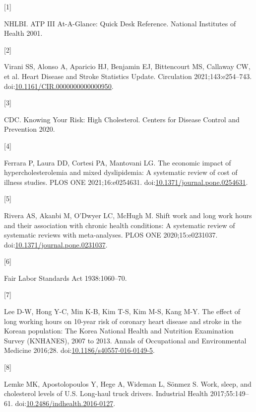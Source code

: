 \documentclass[]{elsarticle} %
\newlength{\cslhangindent}
\newlength{\csllabelwidth}
\newenvironment{CSLReferences}[2] %
 {%
  \setlength{\parindent}{0pt}
  \ifodd #1 \everypar{\setlength{\hangindent}{\cslhangindent}}\ignorespaces\fi
  \ifnum #2 > 0
  \setlength{\parskip}{#2\baselineskip}
  \fi
 }%
 {}
\newcommand{\CSLLeftMargin}[1]{\parbox[t]{\csllabelwidth}{#1}}
\newcommand{\CSLRightInline}[1]{\parbox[t]{\linewidth - \csllabelwidth}{#1}\break}
\begin{document}
\hypertarget{refs}{}
\begin{CSLReferences}{0}{0}
\leavevmode{}%
\CSLLeftMargin{{[}1{]} }
\CSLRightInline{NHLBI. {ATP III At}-{A}-{Glance}: Quick {Desk
Reference}. National Institutes of Health 2001.}

\leavevmode{}%
\CSLLeftMargin{{[}2{]} }
\CSLRightInline{Virani SS, Alonso A, Aparicio HJ, Benjamin EJ,
Bittencourt MS, Callaway CW, et al. Heart {Disease} and {Stroke
Statistics}\textemdash 2021 {Update}. Circulation 2021;143:e254--743.
doi:\href{https://doi.org/10.1161/CIR.0000000000000950}{10.1161/CIR.0000000000000950}.}

\leavevmode{}%
\CSLLeftMargin{{[}3{]} }
\CSLRightInline{CDC. Knowing {Your Risk}: High {Cholesterol}. Centers
for Disease Control and Prevention 2020.}

\leavevmode{}%
\CSLLeftMargin{{[}4{]} }
\CSLRightInline{Ferrara P, Laura DD, Cortesi PA, Mantovani LG. The
economic impact of hypercholesterolemia and mixed dyslipidemia: A
systematic review of cost of illness studies. PLOS ONE 2021;16:e0254631.
doi:\href{https://doi.org/10.1371/journal.pone.0254631}{10.1371/journal.pone.0254631}.}

\leavevmode{}%
\CSLLeftMargin{{[}5{]} }
\CSLRightInline{Rivera AS, Akanbi M, O'Dwyer LC, McHugh M. Shift work
and long work hours and their association with chronic health
conditions: A systematic review of systematic reviews with
meta-analyses. PLOS ONE 2020;15:e0231037.
doi:\href{https://doi.org/10.1371/journal.pone.0231037}{10.1371/journal.pone.0231037}.}

\leavevmode{}%
\CSLLeftMargin{{[}6{]} }
\CSLRightInline{Fair {Labor Standards Act} 1938:1060--70.}

\leavevmode{}%
\CSLLeftMargin{{[}7{]} }
\CSLRightInline{Lee D-W, Hong Y-C, Min K-B, Kim T-S, Kim M-S, Kang M-Y.
The effect of long working hours on 10-year risk of coronary heart
disease and stroke in the {Korean} population: The {Korea National
Health} and {Nutrition Examination Survey} ({KNHANES}), 2007 to 2013.
Annals of Occupational and Environmental Medicine 2016;28.
doi:\href{https://doi.org/10.1186/s40557-016-0149-5}{10.1186/s40557-016-0149-5}.}

\leavevmode{}%
\CSLLeftMargin{{[}8{]} }
\CSLRightInline{Lemke MK, Apostolopoulos Y, Hege A, Wideman L, Sönmez S.
Work, sleep, and cholesterol levels of {U}.{S}. Long-haul truck drivers.
Industrial Health 2017;55:149--61.
doi:\href{https://doi.org/10.2486/indhealth.2016-0127}{10.2486/indhealth.2016-0127}.}


\end{CSLReferences}
\end{document}
